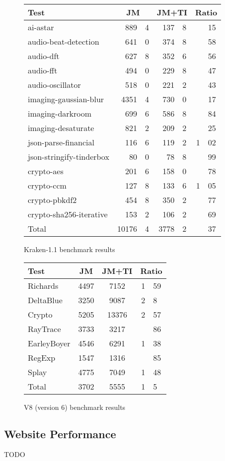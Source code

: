 \begin{figure}
\begin{center}
\begin{tabular}{|l|r@{.}lr@{.}l|r@{.}l|}
\hline
Test & \multicolumn{2}{|c|}{JM}
     & \multicolumn{2}{|c|}{JM+TI}
     & \multicolumn{2}{|c|}{Ratio} \\
\hline
ai-astar & 889&4 & 137&8 & &15 \\
audio-beat-detection & 641&0 & 374&8 & &58 \\
audio-dft & 627&8 & 352&6 & &56 \\
audio-fft & 494&0 & 229&8 & &47 \\
audio-oscillator & 518&0 & 221&2 & &43 \\
imaging-gaussian-blur & 4351&4 & 730&0 & &17 \\
imaging-darkroom & 699&6 & 586&8 & &84 \\
imaging-desaturate & 821&2 & 209&2 & &25 \\
json-parse-financial & 116&6 & 119&2 & 1&02 \\
json-stringify-tinderbox & 80&0 & 78&8 & &99 \\
crypto-aes & 201&6 & 158&0 & &78 \\
crypto-ccm & 127&8 & 133&6 & 1&05 \\
crypto-pbkdf2 & 454&8 & 350&2 & &77 \\
crypto-sha256-iterative & 153&2 & 106&2 & &69 \\
\hline
Total & 10176&4 & 3778&2 & &37 \\
\hline
\end{tabular}
\end{center}
\caption{Kraken-1.1 benchmark results}
\end{figure}

\begin{figure}
\begin{center}
\begin{tabular}{|l|cc|r@{.}l|}
\hline
Test & JM & JM+TI & \multicolumn{2}{|c|}{Ratio} \\
\hline
Richards & 4497 & 7152 & 1&59 \\
DeltaBlue & 3250 & 9087 & 2&8 \\
Crypto & 5205 & 13376 & 2&57 \\
RayTrace & 3733 & 3217 & &86 \\
EarleyBoyer & 4546 & 6291 & 1&38 \\
RegExp & 1547 & 1316 & &85 \\
Splay & 4775 & 7049 & 1&48 \\
\hline
Total & 3702 & 5555 & 1&5 \\
\hline
\end{tabular}
\end{center}
\caption{V8 (version 6) benchmark results}
\end{figure}

\subsection{Website Performance}

TODO
